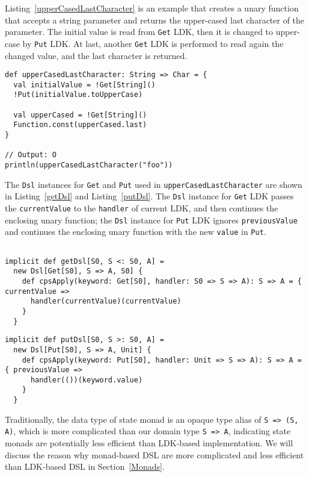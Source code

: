 Listing~\ref{upperCasedLastCharacter} is an example that creates a unary function that accepts a string parameter and returns the upper-cased last character of the parameter. The initial value is read from \lstinline{Get} LDK, then it is changed to upper-case by \lstinline{Put} LDK. At last, another \lstinline{Get} LDK is performed to read again  the changed value, and the last character is returned.

\begin{lstlisting}[caption={Using \lstinline{Get} and \lstinline{Put} in a unary function},label={upperCasedLastCharacter}]
def upperCasedLastCharacter: String => Char = {
  val initialValue = !Get[String]()
  !Put(initialValue.toUpperCase)

  val upperCased = !Get[String]()
  Function.const(upperCased.last)
}

// Output: O
println(upperCasedLastCharacter("foo"))
\end{lstlisting}

The \lstinline{Dsl} instances for \lstinline{Get} and \lstinline{Put} used in \lstinline{upperCasedLastCharacter} are shown in Listing~\ref{getDsl} and Listing~\ref{putDsl}. The \lstinline{Dsl} instance for \lstinline{Get} LDK passes the \lstinline{currentValue} to the \lstinline{handler} of current LDK, and then continues the enclosing unary function; the \lstinline{Dsl} instance for \lstinline{Put} LDK ignores \lstinline{previousValue} and continues the enclosing unary function with the new \lstinline{value} in \lstinline{Put}.

\begin{lstlisting}[caption={The \lstinline{Dsl} instance for \lstinline{Get} LDK},label={getDsl}]

implicit def getDsl[S0, S <: S0, A] =
  new Dsl[Get[S0], S => A, S0] {
    def cpsApply(keyword: Get[S0], handler: S0 => S => A): S => A = { currentValue =>
      handler(currentValue)(currentValue)
    }
  }
\end{lstlisting}

\begin{lstlisting}[caption={The \lstinline{Dsl} instance for \lstinline{Put} LDK},label={putDsl}]
implicit def putDsl[S0, S >: S0, A] =
  new Dsl[Put[S0], S => A, Unit] {
    def cpsApply(keyword: Put[S0], handler: Unit => S => A): S => A = { previousValue =>
      handler(())(keyword.value)
    }
  }
\end{lstlisting}

Traditionally, the data type of state monad is an opaque type alias of \lstinline{S => (S, A)}, which is more complicated than our domain type \lstinline{S => A}, indicating state monads are potentially less efficient than LDK-based implementation. We will discuss the reason why monad-based DSL are more complicated and less efficient than LDK-based DSL in Section~\ref{Monads}.

